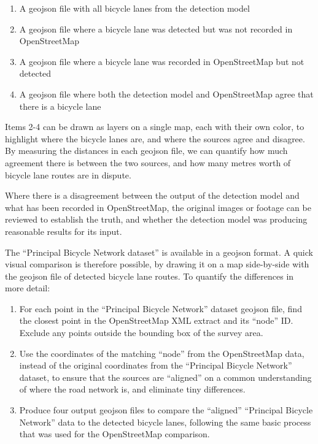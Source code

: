 \documentclass[11pt,twoside]{report}
\begin{document}
\begin{enumerate}
\item{A geojson file with all bicycle lanes from the detection model}
\item{A geojson file where a bicycle lane was detected but was not recorded in OpenStreetMap}
\item{A geojson file where a bicycle lane was recorded in OpenStreetMap but not detected}
\item{A geojson file where both the detection model and OpenStreetMap agree that there is a bicycle lane}	
\end{enumerate}

Items 2-4 can be drawn as layers on a single map, each with their own color, to highlight where the bicycle lanes are, and where the sources agree and disagree.  By measuring the distances in each geojson file, we can quantify how much agreement there is between the two sources, and how many metres worth of bicycle lane routes are in dispute.

Where there is a disagreement between the output of the detection model and what has been recorded in OpenStreetMap, the original images or footage can be reviewed to establish the truth, and whether the detection model was producing reasonable results for its input.

The ``Principal Bicycle Network dataset'' is available in a geojson format.  A quick visual comparison is therefore possible, by drawing it on a map side-by-side with the geojson file of detected bicycle lane routes.  To quantify the differences in more detail:

\begin{enumerate}
\item{For each point in the ``Principal Bicycle Network'' dataset geojson file, find the closest point in the OpenStreetMap XML extract and its ``node'' ID.  Exclude any points outside the bounding box of the survey area.}
\item{Use the coordinates of the matching ``node'' from the OpenStreetMap data, instead of the original coordinates from the ``Principal Bicycle Network'' dataset, to ensure that the sources are ``aligned'' on a common understanding  of where the road network is, and eliminate tiny differences.}
\item{Produce four output geojson files to compare the ``aligned'' ``Principal Bicycle Network'' data to the detected bicycle lanes, following the same basic process that was used for the OpenStreetMap comparison.}
\end{enumerate}
\end{document}

